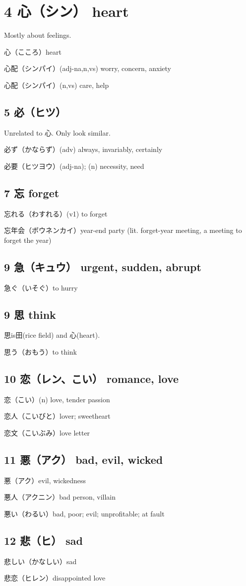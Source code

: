 \chapter{4 心（シン） heart}

Mostly about feelings.

心（こころ）heart

心配（シンパイ）(adj-na,n,vs) worry, concern, anxiety

心配（シンパイ）(n,vs) care, help

\section{5 必（ヒツ）}

Unrelated to 心. Only look similar.

必ず（かならず）(adv) always, invariably, certainly

必要（ヒツヨウ）(adj-na); (n) necessity, need

\section{7 忘 forget}

忘れる（わすれる）(v1) to forget

忘年会（ボウネンカイ）year-end party (lit. forget-year meeting, a meeting to forget the year)

\section{9 急（キュウ） urgent, sudden, abrupt}

急ぐ（いそぐ）to hurry

\section{9 思 think}

思is田(rice field) and 心(heart).

思う（おもう）to think

\section{10 恋（レン、こい） romance, love}

恋（こい）(n) love, tender passion

恋人（こいびと）lover; sweetheart

恋文（こいぶみ）love letter

\section{11 悪（アク） bad, evil, wicked}

悪（アク）evil, wickedness

悪人（アクニン）bad person, villain

悪い（わるい）bad, poor; evil; unprofitable; at fault

\section{12 悲（ヒ） sad}

悲しい（かなしい）sad

悲恋（ヒレン）disappointed love

